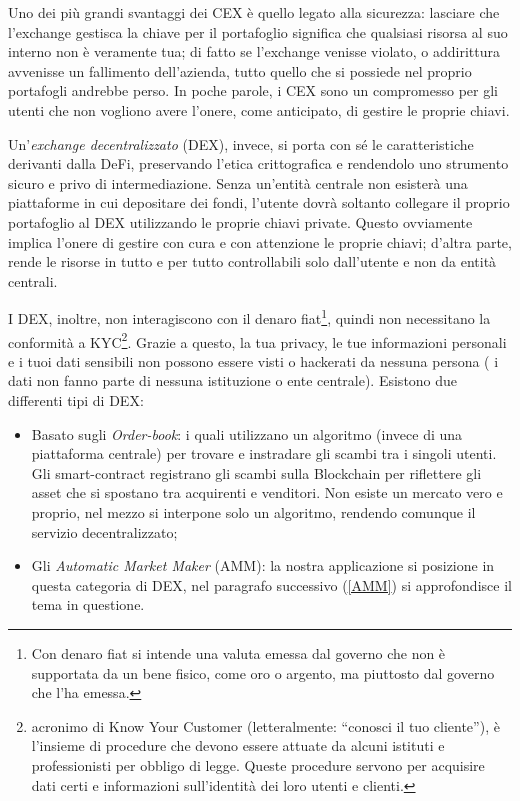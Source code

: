 Uno dei più grandi svantaggi dei CEX è quello legato alla sicurezza: lasciare che l'exchange gestisca la chiave per il portafoglio significa che qualsiasi risorsa al suo interno non è veramente tua; di fatto se l'exchange venisse violato, o addirittura avvenisse un fallimento dell'azienda, tutto quello che si possiede nel proprio portafogli andrebbe perso. In poche parole, i CEX sono un compromesso per gli utenti che non vogliono avere l'onere, come anticipato, di gestire le proprie chiavi.

Un'\textit{exchange decentralizzato} (DEX), invece, si porta con sé le caratteristiche derivanti dalla DeFi, preservando l'etica crittografica e rendendolo uno strumento sicuro e privo di intermediazione.
Senza un'entità centrale non esisterà una piattaforme in cui depositare dei fondi, l'utente dovrà soltanto collegare il proprio portafoglio al DEX utilizzando le proprie chiavi private. Questo ovviamente implica l'onere di gestire con cura e con attenzione le proprie chiavi; d'altra parte, rende le risorse in tutto e per tutto controllabili solo dall'utente e non da entità centrali.

I DEX, inoltre, non interagiscono con il denaro fiat\footnote{Con denaro fiat si intende una valuta emessa dal governo che non è supportata da un bene fisico, come oro o argento, ma piuttosto dal governo che l'ha emessa.}, quindi non necessitano la conformità a KYC\footnote{acronimo di Know Your Customer (letteralmente: “conosci il tuo cliente”), è l’insieme di procedure che devono essere attuate da alcuni istituti e professionisti per obbligo di legge. Queste procedure servono per acquisire dati certi e informazioni sull’identità dei loro utenti e clienti.}.
Grazie a questo, la tua privacy, le tue informazioni personali e i tuoi dati sensibili non possono essere visti o hackerati da nessuna persona ( i dati non fanno parte di nessuna istituzione o ente centrale).
Esistono due differenti tipi di DEX:
\begin{itemize}
\item  Basato sugli \textit{Order-book}: i quali utilizzano un algoritmo (invece di una piattaforma centrale) per trovare e instradare gli scambi tra i singoli utenti. Gli smart-contract registrano gli scambi sulla Blockchain per riflettere gli asset che si spostano tra acquirenti e venditori. Non esiste un mercato vero e proprio, nel mezzo si interpone solo un algoritmo, rendendo comunque il servizio decentralizzato;
\item Gli \textit{Automatic Market Maker} (AMM): la nostra applicazione si posizione in questa categoria di DEX, nel paragrafo successivo (\ref{AMM}) si approfondisce il tema in questione.
\end{itemize}

